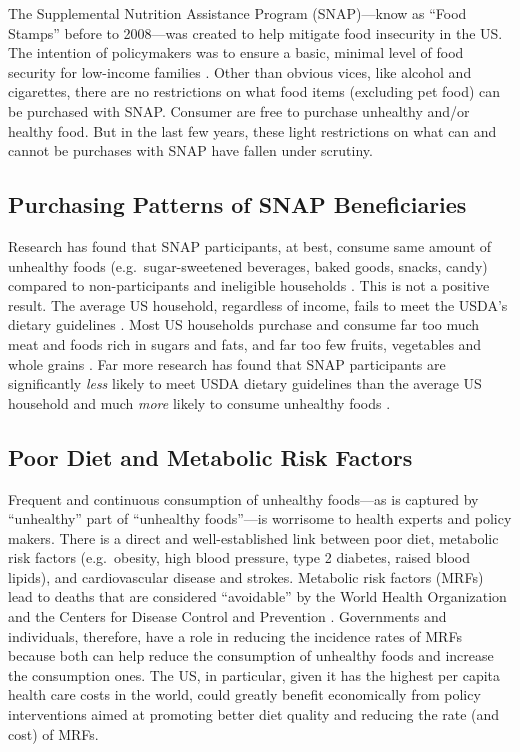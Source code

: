 \documentclass[11pt,letterpaper,]{book}
\begin{document}
The Supplemental Nutrition Assistance Program (SNAP)---know as ``Food
Stamps'' before to 2008---was created to help mitigate food insecurity
in the US. The intention of policymakers was to ensure a basic, minimal
level of food security for low-income families
\citep{usda_fns_short_2014}. Other than obvious vices, like alcohol and
cigarettes, there are no restrictions on what food items (excluding pet
food) can be purchased with SNAP. Consumer are free to purchase
unhealthy and/or healthy food. But in the last few years, these light
restrictions on what can and cannot be purchases with SNAP have fallen
under scrutiny.

\subsection{Purchasing Patterns of SNAP
Beneficiaries}\label{purchasing-patterns-of-snap-beneficiaries}

Research has found that SNAP participants, at best, consume same amount
of unhealthy foods (e.g.~sugar-sweetened beverages, baked goods, snacks,
candy) compared to non-participants and ineligible households
\citep{todd_caloric_2014, hoynes_snap_2014}. This is not a positive
result. The average US household, regardless of income, fails to meet
the USDA's dietary guidelines \citep{usda_scientific_2015}. Most US
households purchase and consume far too much meat and foods rich in
sugars and fats, and far too few fruits, vegetables and whole grains
\citep{frazao_americas_1999}. Far more research has found that SNAP
participants are significantly \emph{less} likely to meet USDA dietary
guidelines than the average US household and much \emph{more} likely to
consume unhealthy foods
\citep{andreyeva_dietary_2015, leung_dietary_2012, nguyen_supplemental_2015, wolfson_fruit_2015}.

\subsection{Poor Diet and Metabolic Risk
Factors}\label{poor-diet-and-metabolic-risk-factors}

Frequent and continuous consumption of unhealthy foods---as is captured
by ``unhealthy'' part of ``unhealthy foods''---is worrisome to health
experts and policy makers. There is a direct and well-established link
between poor diet, metabolic risk factors (e.g.~obesity, high blood
pressure, type 2 diabetes, raised blood lipids), and cardiovascular
disease and strokes. Metabolic risk factors (MRFs) lead to deaths that
are considered ``avoidable'' by the World Health Organization and the
Centers for Disease Control and Prevention
\citep{who_global_2014, cdc_vital_2013}. Governments and individuals,
therefore, have a role in reducing the incidence rates of MRFs because
both can help reduce the consumption of unhealthy foods and increase the
consumption ones. The US, in particular, given it has the highest per
capita health care costs in the world, could greatly benefit
economically from policy interventions aimed at promoting better diet
quality and reducing the rate (and cost) of MRFs.
\end{document}
